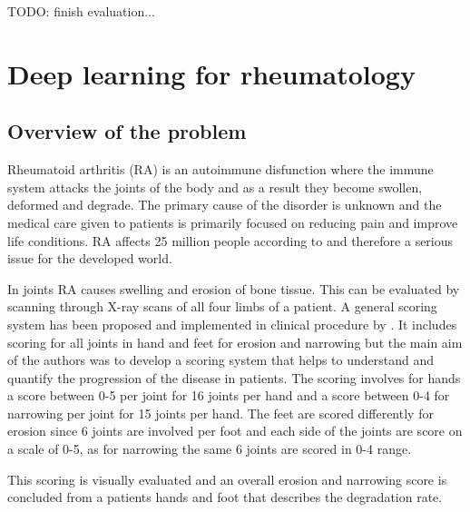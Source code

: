 \documentclass[a4paper,12pt]{article}
\begin{document}
\vspace{4mm}

\par TODO: finish evaluation...

\newpage

\section{Deep learning for rheumatology}

\vspace{7mm}

\subsection{Overview of the problem}

\vspace{4mm}

\par Rheumatoid arthritis (RA) is an autoimmune disfunction where the immune system attacks the joints of the body and as a result they become swollen, deformed and degrade. The primary cause of the disorder is unknown and the medical care given to patients is primarily focused on reducing pain and improve life conditions. RA affects 25 million people according to \cite{vos2016global} and therefore a serious issue for the developed world.

\vspace{4mm}

\par In joints RA causes swelling and erosion of bone tissue. This can be evaluated by scanning through X-ray scans of all four limbs of a patient. A general scoring system has been proposed and implemented in clinical procedure by \cite{van1995radiographic}. It includes scoring for all joints in hand and feet for erosion and narrowing but the main aim of the authors was to develop a scoring system that helps to understand and quantify the progression of the disease in patients. The scoring involves for hands a score between 0-5 per joint for 16 joints per hand and a score between 0-4 for narrowing per joint for 15 joints per hand. The feet are scored differently for erosion since 6 joints are involved per foot and each side of the joints are score on a scale of 0-5, as for narrowing the same 6 joints are scored in 0-4 range.

\vspace{4mm}

\par This scoring is visually evaluated and an overall erosion and narrowing score is concluded from a patients hands and foot that describes the degradation rate. 
\end{document}
